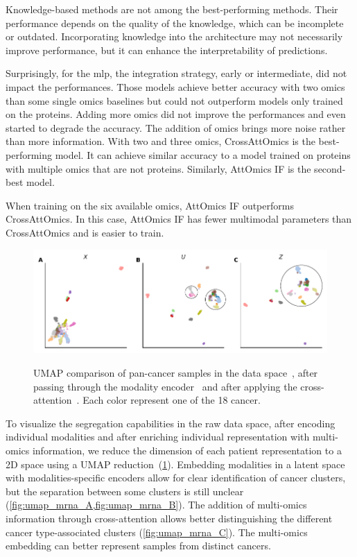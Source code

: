 \documentclass[../main.tex]{subfiles}
\begin{document}
		Knowledge-based methods are not among the best-performing methods.
		Their performance depends on the quality of the knowledge, which can be incomplete or outdated.
		Incorporating knowledge into the architecture may not necessarily improve performance, but it can enhance the interpretability of predictions.

		Surprisingly, for the \gls{mlp}, the integration strategy, early or intermediate, did not impact the performances.
		Those models achieve better accuracy with two omics than some single omics baselines but could not outperform models only trained on the proteins.
		Adding more omics did not improve the performances and even started to degrade the accuracy.
		The addition of omics brings more noise rather than more information.
		With two and three omics, CrossAttOmics is the best-performing model.
		It can achieve similar accuracy to a model trained on proteins with multiple omics that are not proteins.
		Similarly, AttOmics IF is the second-best model.

		When training on the six available omics, AttOmics IF outperforms CrossAttOmics.
		In this case, AttOmics IF has fewer multimodal parameters than CrossAttOmics and is easier to train.

		\begin{figure}
			\centering
			\begin{subcaptiongroup}
				\includegraphics{umap_mRNA.pdf}
				\label{fig:umap_mrna_A}
				\label{fig:umap_mrna_B}
				\label{fig:umap_mrna_C}
			\end{subcaptiongroup}
			\caption[UMAP comparison of pan-cancer samples]{UMAP comparison of pan-cancer samples in the data space~, after passing through the modality encoder~ and after applying the cross-attention~. Each color represent one of the 18 cancer. }\label{fig:umap_mrna}
		\end{figure}

		To visualize the segregation capabilities in the raw data space, after encoding individual modalities and after enriching individual representation with multi-omics information, we reduce the dimension of each patient representation to a 2D space using a UMAP reduction~(\cref{fig:umap_mrna}).
		Embedding modalities in a latent space with modalities-specific encoders allow for clear identification of cancer clusters, but the separation between some clusters is still unclear (\cref{fig:umap_mrna_A,fig:umap_mrna_B}).
		The addition of multi-omics information through cross-attention allows better distinguishing the different cancer type-associated clusters (\cref{fig:umap_mrna_C}).
		The multi-omics embedding can better represent samples from distinct cancers.
\end{document}

